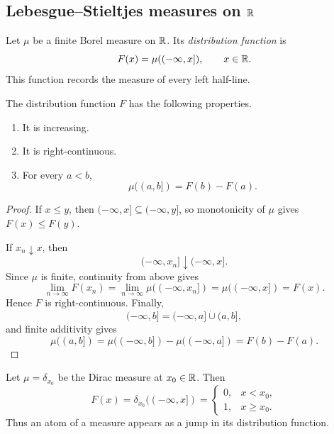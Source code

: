 \subsection{Lebesgue--Stieltjes measures on \texorpdfstring{$\mathbb{R}$}{R}}

Let $\mu$ be a finite Borel measure on $\mathbb{R}$. Its
\emph{distribution function} is
\begin{equation}\label{eq:distribution-function-sep-08}
  F(x)=\mu((-\infty,x]),
  \qquad x\in\mathbb{R}.
\end{equation}
This function records the measure of every left half-line.

\begin{proposition}\label{prop:distribution-function-properties-sep-08}
  The distribution function $F$ has the following properties.
  \begin{enumerate}[label=(\roman*)]
    \item It is increasing.
    \item It is right-continuous.
    \item For every $a<b$,
      \[
        \mu((a,b])=F(b)-F(a).
      \]
  \end{enumerate}
\end{proposition}

\begin{proof}
  If $x\leq y$, then $(-\infty,x]\subseteq(-\infty,y]$, so
  monotonicity of $\mu$ gives $F(x)\leq F(y)$.

  If $x_n\downarrow x$, then
  \[
    (-\infty,x_n]\downarrow(-\infty,x].
  \]
  Since $\mu$ is finite, continuity from above gives
  \[
    \lim_{n\to\infty}F(x_n)
    =\lim_{n\to\infty}\mu((-\infty,x_n])
    =\mu((-\infty,x])
    =F(x).
  \]
  Hence $F$ is right-continuous. Finally,
  \[
    (-\infty,b]=(-\infty,a]\mathbin{\dot\cup}(a,b],
  \]
  and finite additivity gives
  \[
    \mu((a,b])
    =\mu((-\infty,b])-\mu((-\infty,a])
    =F(b)-F(a).
  \]
\end{proof}

\begin{example}
  Let $\mu=\delta_{x_0}$ be the Dirac measure at $x_0\in\mathbb{R}$.
  Then
  \[
    F(x)=\delta_{x_0}((-\infty,x])
    =\begin{cases}
      0,&x<x_0,\\
      1,&x\geq x_0.
    \end{cases}
  \]
  Thus an atom of a measure appears as a jump in its distribution
  function.
\end{example}

